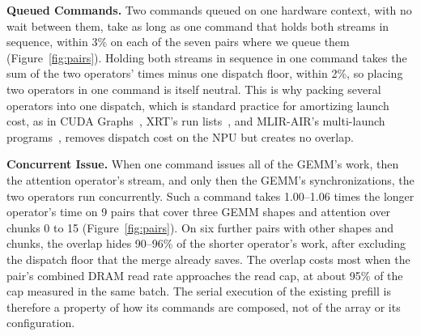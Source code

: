 \textbf{Queued Commands.}
Two commands queued on one hardware context, with no wait between them, take as long as one command that holds both streams in sequence, within 3\% on each of the seven pairs where we queue them (Figure~\ref{fig:pairs}).
Holding both streams in sequence in one command takes the sum of the two operators' times minus one dispatch floor, within 2\%, so placing two operators in one command is itself neutral.
This is why packing several operators into one dispatch, which is standard practice for amortizing launch cost, as in CUDA Graphs~\citep{nvidia-cudagraphs}, XRT's run lists~\citep{xrt-repo}, and MLIR-AIR's multi-launch programs~\citep{wang2026mlirair}, removes dispatch cost on the NPU but creates no overlap.

\textbf{Concurrent Issue.}
When one command issues all of the GEMM's work, then the attention operator's stream, and only then the GEMM's synchronizations, the two operators run concurrently.
Such a command takes 1.00--1.06 times the longer operator's time on 9 pairs that cover three GEMM shapes and attention over chunks 0 to 15 (Figure~\ref{fig:pairs}).
On six further pairs with other shapes and chunks, the overlap hides 90--96\% of the shorter operator's work, after excluding the dispatch floor that the merge already saves.
The overlap costs most when the pair's combined DRAM read rate approaches the read cap, at about 95\% of the cap measured in the same batch.
The serial execution of the existing prefill is therefore a property of how its commands are composed, not of the array or its configuration.

